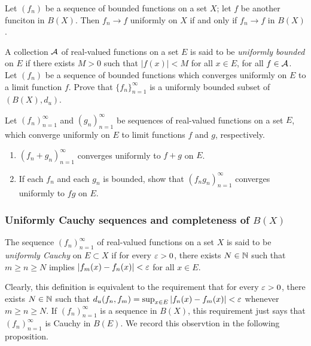\documentclass[12pt]{scrartcl} %
\begin{document}
\begin{proposition}
    Let $(f_n)$ be a sequence of bounded functions on a set $X$; let $f$ be another funciton in $B(X)$. Then $f_n \to f$ uniformly on $X$ if and only if $f_n \to f$ in $B(X)$.
\end{proposition}

\begin{exercise}
    A collection $\mathcal{A}$ of real-valued functions on a set $E$ is said to be \textit{uniformly bounded} on $E$ if there exists $M > 0$ such that $|f(x)| < M$ for all $x \in E$, for all $f \in \mathcal{A}$. Let $(f_n)$ be a sequence of bounded functions which converges uniformly on $E$ to a limit function $f$. Prove that $\{f_n\}_{n=1}^{\infty}$ is a uniformly bounded subset of $(B(X), d_u)$.
\end{exercise}

\begin{proposition}
    Let $(f_n)_{n=1}^{\infty}$ and $(g_n)_{n=1}^{\infty}$ be sequences of real-valued functions on a set $E$, which converge uniformly on $E$ to limit functions $f$ and $g$, respectively. \begin{enumerate}
        \item $(f_n + g_n)_{n=1}^{\infty}$ converges uniformly to $f + g$ on $E$.
        \item If each $f_n$ and each $g_n$ is bounded, show that $(f_n g_n)_{n=1}^{\infty}$ converges uniformly to $fg$ on $E$.
    \end{enumerate}
\end{proposition}

\subsubsection{Uniformly Cauchy sequences and completeness of $B(X)$}

\begin{definition}
    The sequence $(f_n)_{n=1}^{\infty}$ of real-valued functions on a set $X$ is said to be \textit{uniformly Cauchy} on $E \subset X$ if for every $\varepsilon > 0$, there exists $N \in \mathbb{N}$ such that $m \geq n \geq N$ implies $|f_m(x) - f_n(x)| < \varepsilon$ for all $x \in E$.
\end{definition}

Clearly, this definition is equivalent to the requirement that for every $\varepsilon > 0$, there exists $N \in \mathbb{N}$ such that $d_u(f_n, f_m) = \sup_{x \in E}|f_n(x) - f_m(x)| < \varepsilon$ whenever $m \geq n \geq N$. If $(f_n)_{n=1}^{\infty}$ is a sequence in $B(X)$, this requirement just says that $(f_n)_{n=1}^{\infty}$ is Cauchy in $B(E)$. We record this observtion in the following proposition.
\end{document}
